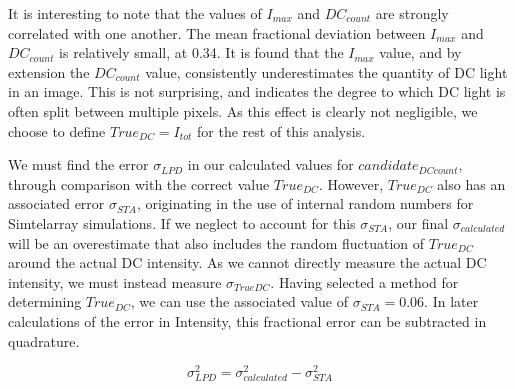 \documentclass[11pt]{article}
\begin{document}
It is interesting to note that the values of $I_{max}$ and $DC_{count}$ are strongly correlated with one another. The mean fractional deviation between $I_{max}$ and $DC_{count}$ is relatively small, at 0.34. It is found that the $I_{max}$ value, and by extension the $DC_{count}$ value, consistently underestimates the quantity of DC light in an image. This is not surprising, and indicates the degree to which DC light is often split between multiple pixels. As this effect is clearly not negligible, we choose to define $True_{DC}=I_{tot}$ for the rest of this analysis.

We must find the error $\sigma_{LPD}$ in our calculated values for $candidate_{DC count}$, through comparison with the correct value $True_{DC}$. However, $True_{DC}$ also has an associated error $\sigma_{STA}$, originating in the use of internal random numbers for Sim\textunderscore telarray simulations. If we neglect to account for this $\sigma_{STA}$, our final $\sigma_{calculated}$ will be an overestimate that also includes the random fluctuation of $True_{DC}$ around the actual DC intensity. As we cannot directly measure the actual DC intensity, we must instead measure $\sigma_{TrueDC}$. Having selected a method for determining $True_{DC}$, we can use the associated value of $\sigma_{STA}=0.06$. In later calculations of the error in Intensity, this fractional error can be subtracted in quadrature. 

\[ \sigma_{LPD}^{2} = \sigma_{calculated}^{2} - \sigma_{STA}^{2}  \]
\end{document}

